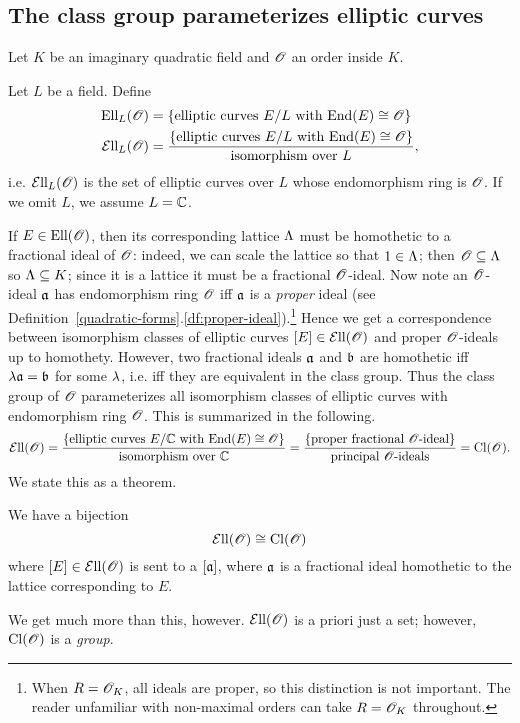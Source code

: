 \subsection{The class group parameterizes elliptic curves}
Let $K$ be an imaginary quadratic field and $\mathscr{O}$ an order inside $K$.
\begin{df}
Let $L$ be a field. Define
\begin{align*}
\text{Ell}_L(\mathscr{O})&=\{\text{elliptic curves $E/L$ with $\operatorname{End}(E)\cong \mathscr{O}$}\}\\
\mathcal{E}{\rm{ll}}_{L}(\mathscr{O})&=\frac{\{\text{elliptic curves $E/L$ with $\operatorname{End}(E)\cong \mathscr{O}$}\}}{\text{isomorphism over }L},
\end{align*}
i.e. $\mathcal{E}{\rm{ll}}_L(\mathscr{O})$ is the set of elliptic curves over $L$ whose endomorphism ring is $\mathscr{O}$. If we omit $L$, we assume $L=\mathbb{C}$.
\end{df}
If $E\in \text{Ell}(\mathscr{O})$, then its corresponding lattice $\Lambda$ must be homothetic to a fractional ideal of $\mathscr{O}$: indeed, we can scale the lattice so that $1\in \Lambda$; then $\mathscr{O}\subseteq \Lambda$ so $\Lambda\subseteq K$; since it is a lattice it must be a fractional $\mathscr{O}$-ideal. %
Now note an $\mathscr{O}$-ideal $\mathfrak{a}$ has endomorphism ring $\mathscr{O}$ iff $\mathfrak{a}$ is a {\it proper} ideal (see Definition~\ref{quadratic-forms}.\ref{df:proper-ideal}).\footnote{When $R=\mathscr{O}_K$, all ideals are proper, so this distinction is not important. The reader unfamiliar with non-maximal orders can take $R=\mathscr{O}_K$ throughout.} Hence we get a correspondence between isomorphism classes of elliptic curves $[E]\in \mathcal{E}{\rm{ll}}(\mathscr{O})$ and proper $\mathscr{O}$-ideals up to homothety.
However, two fractional ideals $\mathfrak{a}$ and $\mathfrak{b}$ are homothetic iff $\lambda\mathfrak{a}=\mathfrak{b}$ for some $\lambda$, i.e. iff they are equivalent in the class group. Thus the class group of $\mathscr{O}$ parameterizes all isomorphism classes of elliptic curves with endomorphism ring $\mathscr{O}$. This is summarized in the following.
\[
\mathcal{E}{\rm{ll}}(\mathscr{O})=\frac{\{\text{elliptic curves $E/\mathbb{C}$ with $\operatorname{End}(E)\cong \mathscr{O}$}\}}{\text{isomorphism over }\mathbb{C}}
=\frac{\{\text{proper fractional $\mathscr{O}$-ideal}\}}{\text{principal $\mathscr{O}$-ideals}}=\operatorname{Cl}(\mathscr{O}).
\]
We state this as a theorem.
\begin{thm}
We have a bijection
\[
\mathcal{E}{\rm{ll}}(\mathscr{O})\cong \operatorname{Cl}(\mathscr{O})
\]
where $[E]\in \mathcal{E}{\rm{ll}}(\mathscr{O})$ is sent to a $[\mathfrak{a}]$, where $\mathfrak{a}$ is a fractional ideal homothetic to the lattice corresponding to $E$. 
\end{thm}
We get much more than this, however. $\mathcal{E}{\rm{ll}}(\mathscr{O})$ is a priori just a set; however, $\operatorname{Cl}(\mathscr{O})$ is a {\it group}. 
